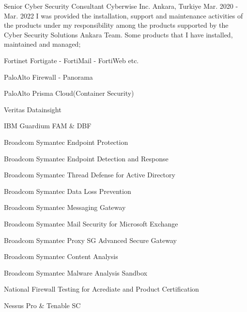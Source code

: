 \begin{cventries}
  \cventry
    {Senior Cyber Security Consultant} %
    {Cyberwise Inc.} %
    {Ankara, Turkiye} %
    {Mar. 2020 - Mar. 2022} %
    {I was provided the installation, support and maintenance activities of the products under my responsibility among the products supported by the Cyber Security Solutions Ankara Team.
    Some products that I have installed, maintained and managed;} %
    {
      \begin{cvitems} %
        \item {Fortinet Fortigate - FortiMail - FortiWeb etc.}
        \item {PaloAlto Firewall - Panorama}
        \item {PaloAlto Prisma Cloud(Container Security)}
        \item {Veritas Datainsight}
        \item {IBM Guardium FAM \& DBF}
        \item {Broadcom Symantec Endpoint Protection}
        \item {Broadcom Symantec Endpoint Detection and Response}
        \item {Broadcom Symantec Thread Defense for Active Directory}   
        \item {Broadcom Symantec Data Loss Prevention}
        \item {Broadcom Symantec Messaging Gateway}
        \item {Broadcom Symantec Mail Security for Microsoft Exchange}
        \item {Broadcom Symantec Proxy SG Advanced Secure Gateway}
        \item {Broadcom Symantec Content Analysis}
        \item {Broadcom Symantec Malware Analysis Sandbox}
        \item {National Firewall Testing for Acrediate and Product Certification}
        \item {Nessus Pro \& Tenable SC} 
      \end{cvitems}
    }


\end{cventries}
